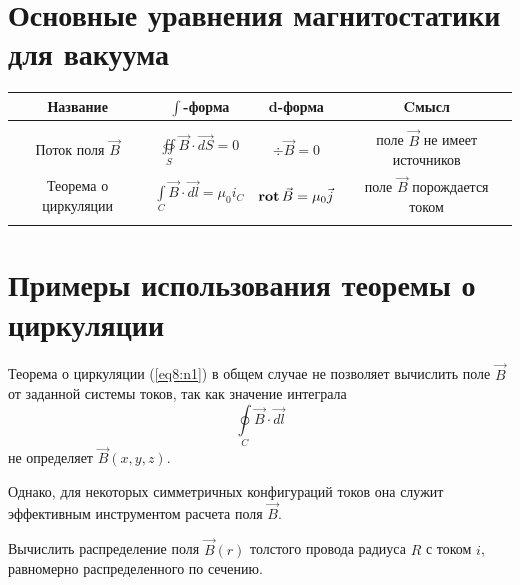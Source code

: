 \section{Основные уравнения магнитостатики для вакуума}

    \begin{tabular}[ht]{|c|c|c|c|} \hline
    Название & \(\int\)-форма & d-форма & Cмысл \\ \hline
    & & & \\
    Поток поля \( \vec{B} \) & \(\oiint\limits_S \vec{B}\cdot\vec{dS} = 0 \)
        & \( \div\vec{B} = 0 \) & поле \(\vec{B}\) не имеет источников \\
    Теорема о циркуляции & \(\int\limits_C \vec{B}\cdot\vec{dl} = \mu_0 i_C \)
        & \( \mathbf{rot\,}\vec{B} = \mu_0\vec{j} \) & поле \(\vec{B}\) порождается током
        \\
    & & & \\ \hline
    \end{tabular}
    
\section{Примеры использования теоремы о циркуляции}

    Теорема о циркуляции (\ref{eq8:n1}) в общем случае не позволяет вычислить
    поле \( \vec{B} \) от заданной системы токов, так как значение интеграла
    \[
        \oint\limits_C \vec{B}\cdot\vec{dl}
    \]
    не определяет \( \vec{B} (x, y, z) \).
    
    Однако, для некоторых симметричных конфигураций токов она служит эффективным
    инструментом расчета поля \( \vec{B} \).
    
    \begin{example}
        Вычислить распределение поля \( \vec{B}(r) \) толстого провода радиуса
        \( R \) с током \( i \), равномерно распределенного по сечению.
    \end{example}
    

